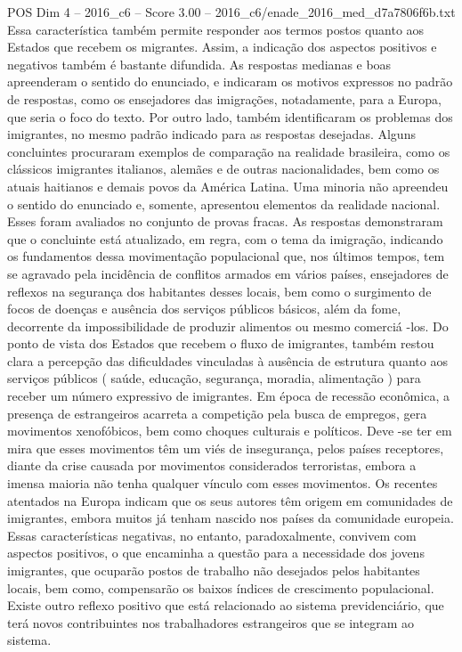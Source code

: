\begin{textsample}{POS Dim 4 – 2016\_c6 – Score 3.00 – 2016\_c6/enade\_2016\_med\_d7a7806f6b.txt}
Essa característica também permite responder aos termos postos quanto aos Estados que recebem os migrantes.
Assim, a indicação dos aspectos positivos e negativos também é bastante difundida.
As respostas medianas e boas apreenderam o sentido do enunciado, e indicaram os motivos expressos no padrão de respostas, como os ensejadores das imigrações, notadamente, para a Europa, que seria o foco do texto.
Por outro lado, também identificaram os problemas dos imigrantes, no mesmo padrão indicado para as respostas desejadas.
Alguns concluintes procuraram exemplos de comparação na realidade brasileira, como os clássicos imigrantes italianos, alemães e de outras nacionalidades, bem como os atuais haitianos e demais povos da América Latina.
Uma minoria não apreendeu o sentido do enunciado e, somente, apresentou elementos da realidade nacional.
Esses foram avaliados no conjunto de provas fracas.
As respostas demonstraram que o concluinte está atualizado, em regra, com o tema da imigração, indicando os fundamentos dessa movimentação populacional que, nos últimos tempos, tem se agravado pela incidência de conflitos armados em vários países, ensejadores de reflexos na segurança dos habitantes desses locais, bem como o surgimento de focos de doenças e ausência dos serviços públicos básicos, além da fome, decorrente da impossibilidade de produzir alimentos ou mesmo comerciá -los.
Do ponto de vista dos Estados que recebem o fluxo de imigrantes, também restou clara a percepção das dificuldades vinculadas à ausência de estrutura quanto aos serviços públicos ( saúde, educação, segurança, moradia, alimentação ) para receber um número expressivo de imigrantes.
Em época de recessão econômica, a presença de estrangeiros acarreta a competição pela busca de empregos, gera movimentos xenofóbicos, bem como choques culturais e políticos.
Deve -se ter em mira que esses movimentos têm um viés de insegurança, pelos países receptores, diante da crise causada por movimentos considerados terroristas, embora a imensa maioria não tenha qualquer vínculo com esses movimentos.
Os recentes atentados na Europa indicam que os seus autores têm origem em comunidades de imigrantes, embora muitos já tenham nascido nos países da comunidade europeia.
Essas características negativas, no entanto, paradoxalmente, convivem com aspectos positivos, o que encaminha a questão para a necessidade dos jovens imigrantes, que ocuparão postos de trabalho não desejados pelos habitantes locais, bem como, compensarão os baixos índices de crescimento populacional.
Existe outro reflexo positivo que está relacionado ao sistema previdenciário, que terá novos contribuintes nos trabalhadores estrangeiros que se integram ao sistema.

\end{textsample}
